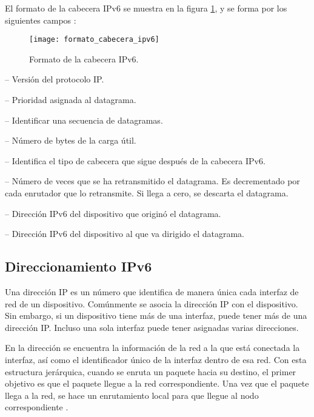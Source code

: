 El formato de la cabecera IPv6 se muestra en la figura
\ref{fig:formato_cabecera_ipv6}, y se forma por los siguientes campos
\cite{RFC2460}:

\begin{figure}[th]
\centering
\texttt{[image: formato\_cabecera\_ipv6]}
\decoRule
\caption[Cabecera IPv6]{Formato de la cabecera IPv6.}
\label{fig:formato_cabecera_ipv6}
\end{figure}

 -- Versión del protocolo IP.

 -- Prioridad asignada al datagrama.

 -- Identificar una secuencia de
datagramas.

 -- Número de bytes de la carga útil.

 -- Identifica el tipo de cabecera que
sigue después de la cabecera IPv6.

 -- Número de veces que se ha
retransmitido el datagrama. Es decrementado por cada enrutador que lo
retransmite. Si llega a cero, se descarta el datagrama.

 -- Dirección IPv6 del dispositivo
que originó el datagrama.

 -- Dirección IPv6 del dispositivo
al que va dirigido el datagrama.

\subsection{Direccionamiento IPv6}
\label{subsec:direccionamiento_ipv6}

Una dirección IP es un número que identifica de manera única cada interfaz de
red de un dispositivo. Comúnmente se asocia la dirección IP con el dispositivo.
Sin embargo, si un dispositivo tiene más de una interfaz, puede tener más de una
dirección IP. Incluso una sola interfaz puede tener asignadas varias
direcciones.

En la dirección se encuentra la información de la red a la que está conectada la
interfaz, así como el identificador único de la interfaz dentro de esa red. Con
esta estructura jerárquica, cuando se enruta un paquete hacia su destino, el
primer objetivo es que el paquete llegue a la red correspondiente. Una vez que
el paquete llega a la red, se hace un enrutamiento local para que llegue al
nodo correspondiente \cite{Kurose2013}.

